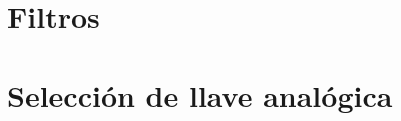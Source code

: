 







\tableofcontents
\newpage


%	
%	
\section{Filtros}
	\label{Ejercicio-2}
	

\section{Selección de llave analógica}
	\label{Ejercicio-3}
	


